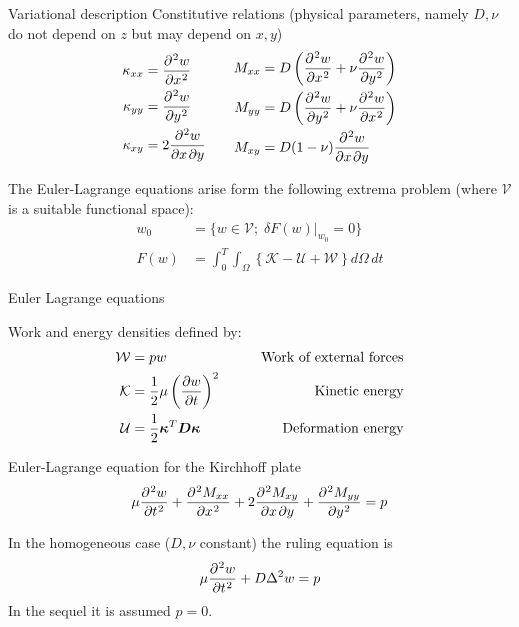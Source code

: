 \documentclass{beamer}
\newcommand{\matr}[1]{\bm{#1}}
\begin{document}
\begin{frame}{Variational description}
Constitutive relations (physical parameters, namely $D, \nu$ do not depend on $z$ but may depend on $x, y$)
\begin{equation*}
\begin{aligned}
\kappa_{xx} & =\diffp[2]{w}{x} \\
\kappa_{yy} & =\diffp[2]{w}{y} \\
\kappa_{xy} & =2 \diffp{w}{x,y} \\
\end{aligned} \qquad
\begin{aligned}
M_{xx} & =D\left(\diffp[2]{w}{x} + \nu \diffp[2]{w}{y}\right)\\
M_{yy} & =D\left(\diffp[2]{w}{y} + \nu \diffp[2]{w}{x}\right)\\
M_{xy} & =D (1 - \nu) \diffp{w}{x,y} \\
\end{aligned}
\end{equation*}


The Euler-Lagrange equations arise form the following extrema problem (where $\mathcal{V}$ is a suitable functional space):
\begin{align*} 
w_0 &= \{w \in \mathcal V; \; \left.\delta F(w) \right|_{w_0} = 0\}  \\
F(w) &= \int_0^T \int_\Omega \left\{\mathcal{K} - \mathcal{U} + \mathcal{W} \right\} d\Omega \, dt
\end{align*}


\end{frame}

\begin{frame}{Euler Lagrange equations}

Work and energy densities defined by:
\begin{align*}
\mathcal{W} &= pw \qquad &\text{Work of external forces}  \\
\mathcal{K} &= \frac{1}{2} \mu \left(\diffp{w}{t}\right)^2  \qquad &\text{Kinetic energy}\\
\mathcal{U} &=  \frac{1}{2} \bm{\kappa}^T \matr{D} \bm{\kappa}  \qquad &\text{Deformation energy}	
\end{align*} 


\begin{block}{Euler-Lagrange equation for the Kirchhoff plate}
	\begin{equation*}
	\mu \diffp[2]{w}{t}  + \diffp[2]{M_{xx}}{x} + 2 \diffp{M_{xy}}{x,y} + \diffp[2]{M_{yy}}{y}= p
	\end{equation*}
\end{block}
In the homogeneous case ($D, \nu$ constant) the ruling equation is
\begin{equation*}
\mu \diffp[2]{w}{t}  + D \Delta^2 w= p
\end{equation*}
In the sequel it is assumed $p=0$.
\end{frame}
\end{document}
